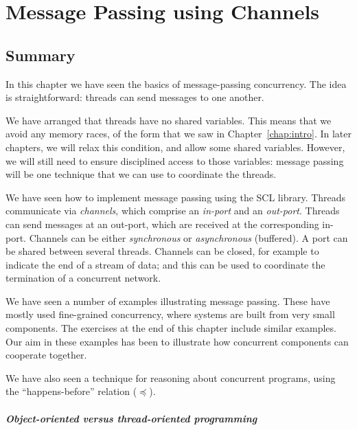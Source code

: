 \chapter{Message Passing using Channels} 



\section{Summary}

In this chapter we have seen the basics of message-passing concurrency.  The
idea is straightforward: threads can send messages to one another.

We have arranged that threads have no shared variables.  This means that we
avoid any memory races, of the form that we saw in Chapter~\ref{chap:intro}.
In later chapters, we will relax this condition, and allow some shared
variables.  However, we will still need to ensure disciplined access to those
variables: message passing will be one technique that we can use to
coordinate the threads.  

We have seen how to implement message passing using the SCL library.  Threads
communicate via \emph{channels}, which comprise an \emph{in-port} and an
\emph{out-port}.  Threads can send messages at an out-port, which are received
at the corresponding in-port.  Channels can be either \emph{synchronous} or
\emph{asynchronous} (buffered).  A port can be shared between several threads.
Channels can be closed, for example to indicate the end of a stream of data;
and this can be used to coordinate the termination of a concurrent network.

We have seen a number of examples illustrating message passing.  These have
mostly used fine-grained concurrency, where systems are built from very small
components.  The exercises at the end of this chapter include similar
examples.  Our aim in these examples has been to illustrate how concurrent
components can cooperate together.

We have also seen a technique for reasoning about concurrent programs, using
the ``happens-before'' relation ($\preceq$).


\paragraph{Object-oriented versus thread-oriented programming}

